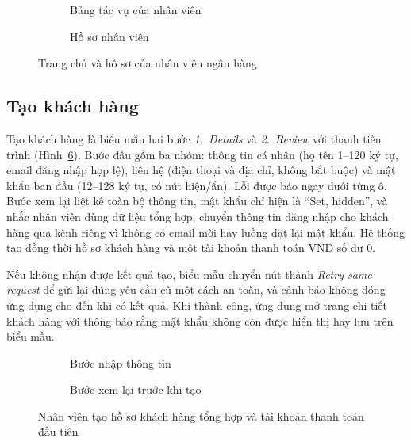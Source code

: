 \begin{figure}[H]
\centering
\begin{subfigure}[t]{0.4\textwidth}
  \centering
  \caption{Bảng tác vụ của nhân viên}
  \label{fig:ch4-officer-main}
\end{subfigure}\hspace{0.05\textwidth}%
\begin{subfigure}[t]{0.4\textwidth}
  \centering
  \caption{Hồ sơ nhân viên}
  \label{fig:ch4-officer-profile}
\end{subfigure}
\caption{Trang chủ và hồ sơ của nhân viên ngân hàng}
\label{fig:ch4-officer-home}
\end{figure}

\subsection{Tạo khách hàng}
\label{sec:ch4-officer-create}

Tạo khách hàng là biểu mẫu hai bước \textit{1.~Details} và \textit{2.~Review} với thanh tiến trình (Hình~\ref{fig:ch4-officer-create}). Bước đầu gồm ba nhóm: thông tin cá nhân (họ tên 1--120 ký tự, email đăng nhập hợp lệ), liên hệ (điện thoại và địa chỉ, không bắt buộc) và mật khẩu ban đầu (12--128 ký tự, có nút hiện/ẩn). Lỗi được báo ngay dưới từng ô. Bước xem lại liệt kê toàn bộ thông tin, mật khẩu chỉ hiện là ``Set, hidden'', và nhắc nhân viên dùng dữ liệu tổng hợp, chuyển thông tin đăng nhập cho khách hàng qua kênh riêng vì không có email mời hay luồng đặt lại mật khẩu. Hệ thống tạo đồng thời hồ sơ khách hàng và một tài khoản thanh toán VND số dư 0.

Nếu không nhận được kết quả tạo, biểu mẫu chuyển nút thành \textit{Retry same request} để gửi lại đúng yêu cầu cũ một cách an toàn, và cảnh báo không đóng ứng dụng cho đến khi có kết quả. Khi thành công, ứng dụng mở trang chi tiết khách hàng với thông báo rằng mật khẩu không còn được hiển thị hay lưu trên biểu mẫu.

\begin{figure}[H]
\centering
\begin{subfigure}[t]{0.4\textwidth}
  \centering
  \caption{Bước nhập thông tin}
  \label{fig:ch4-officer-create-details}
\end{subfigure}\hspace{0.05\textwidth}%
\begin{subfigure}[t]{0.4\textwidth}
  \centering
  \caption{Bước xem lại trước khi tạo}
  \label{fig:ch4-officer-create-review}
\end{subfigure}
\caption{Nhân viên tạo hồ sơ khách hàng tổng hợp và tài khoản thanh toán đầu tiên}
\label{fig:ch4-officer-create}
\end{figure}

